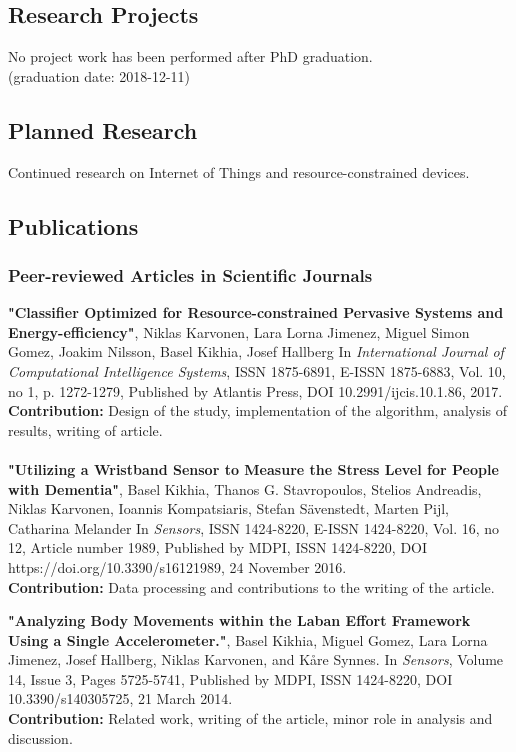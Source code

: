 \documentclass{article}
\begin{document}
\subsection{Research Projects}
No project work has been performed after PhD graduation. \\(graduation date: 2018-12-11)

\subsection{Planned Research}
Continued research on Internet of Things and resource-constrained devices.

\subsection{Publications}
\subsubsection{Peer-reviewed Articles in Scientific Journals}
\textbf{ "Classifier Optimized for Resource-constrained Pervasive Systems and Energy-efficiency"}, 
Niklas Karvonen, Lara Lorna Jimenez, Miguel Simon Gomez, Joakim Nilsson, Basel Kikhia, Josef Hallberg
In \textit{International Journal of Computational Intelligence Systems}, ISSN 1875-6891, E-ISSN 1875-6883, Vol. 10, no 1, p. 1272-1279, 
Published by Atlantis Press, 
DOI 10.2991/ijcis.10.1.86, 
2017.\\
\textbf{Contribution:} Design of the study, implementation of the algorithm, analysis of results, writing of article.
\\ \\

\textbf{ "Utilizing a Wristband Sensor to Measure the Stress Level for People with Dementia"},
Basel Kikhia, Thanos G. Stavropoulos, Stelios Andreadis, Niklas Karvonen, Ioannis Kompatsiaris, Stefan Sävenstedt, Marten Pijl, Catharina Melander
In \textit{Sensors}, ISSN 1424-8220, E-ISSN 1424-8220, Vol. 16, no 12, Article number 1989,
Published by MDPI, ISSN 1424-8220,
DOI https://doi.org/10.3390/s16121989,
24 November 2016.\\
\textbf{Contribution:} Data processing and contributions to the writing of the article.

\textbf{"Analyzing Body Movements within the Laban Effort Framework Using a Single Accelerometer."}, 
Basel Kikhia, Miguel Gomez, Lara Lorna Jimenez, Josef Hallberg, Niklas Karvonen, and Kåre Synnes.
In \textit{ Sensors}, Volume 14, Issue 3, Pages 5725-5741, 
Published by MDPI, ISSN 1424-8220, 
DOI 10.3390/s140305725, 
21 March 2014. \\
\textbf{Contribution:} Related work, writing of the article, minor role in analysis and discussion.
\\ \\
\end{document}
